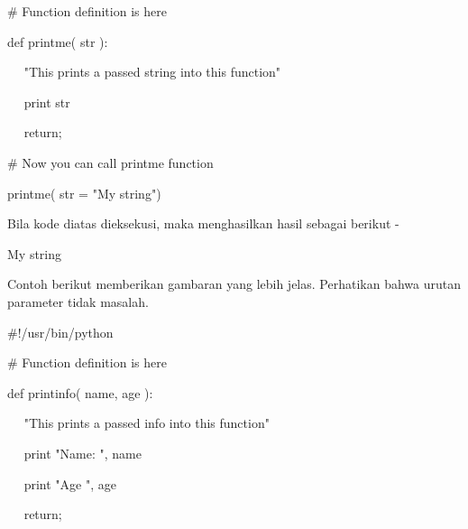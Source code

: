 \vspace{12pt}
\noindent 
 \hspace*{0.5in}  $  \#  $ Function definition is here \par
\noindent 
 \hspace*{0.5in} def printme( str ): \par
\noindent 
 \hspace*{0.5in} ~~ "This prints a passed string into this function" \par
\noindent 
 \hspace*{0.5in} ~~ print str \par
\noindent 
 \hspace*{0.5in} ~~ return; \par
\vspace{12pt}
\noindent 
 \hspace*{0.5in}  $  \#  $ Now you can call printme function \par
\noindent 
 \hspace*{0.5in} printme( str = "My string") \par
\noindent 
Bila kode diatas dieksekusi, maka menghasilkan hasil sebagai berikut - \par
\noindent 
 \hspace*{0.5in} My string \par
\noindent 
Contoh berikut memberikan gambaran yang lebih jelas. Perhatikan bahwa urutan parameter tidak masalah. \par
\noindent 
 \hspace*{0.5in}  $  \#  $!/usr/bin/python \par
\vspace{12pt}
\noindent 
 \hspace*{0.5in}  $  \#  $ Function definition is here \par
\noindent 
 \hspace*{0.5in} def printinfo( name, age ): \par
\noindent 
 \hspace*{0.5in} ~~ "This prints a passed info into this function" \par
\noindent 
 \hspace*{0.5in} ~~ print "Name: ", name \par
\noindent 
 \hspace*{0.5in} ~~ print "Age ", age \par
\noindent 
 \hspace*{0.5in} ~~ return; \par
\vspace{12pt}
